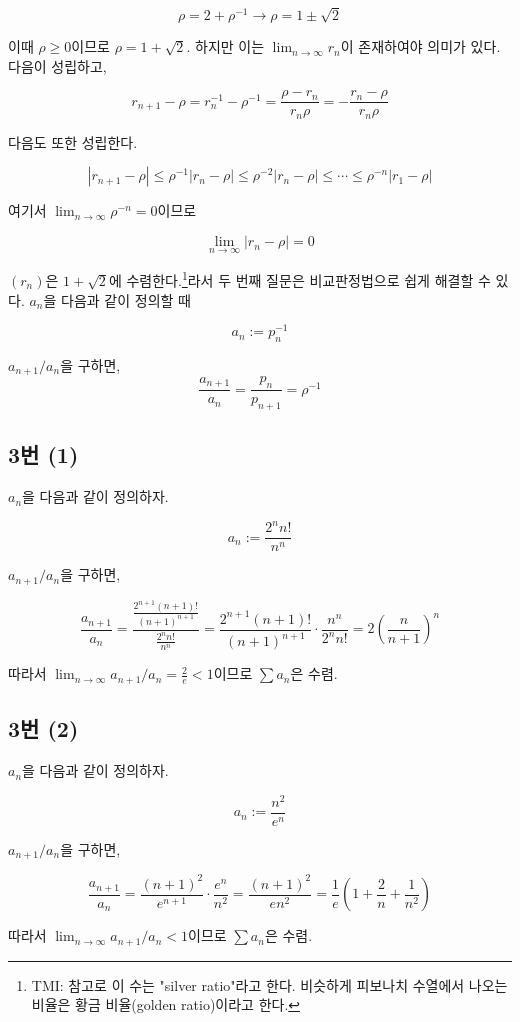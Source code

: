 \[
\rho=2+\rho^{-1} \longrightarrow \rho=1\pm\sqrt{2}
\]

이때 $\rho\geq0$이므로 $\rho=1+\sqrt{2}$. 하지만 이는 $\lim_{n\to\infty}r_n$이 존재하여야 의미가 있다. 다음이 성립하고,

\[
r_{n+1}-\rho=r_n^{-1}-\rho^{-1}=\frac{\rho-r_n}{r_n\rho}=-\frac{r_n-\rho}{r_n\rho}
\]

다음도 또한 성립한다.

\[
|r_{n+1}-\rho|\leq\rho^{-1}|r_n-\rho|\leq\rho^{-2}|r_n-\rho|\leq\cdots\leq\rho^{-n}|r_1-\rho|
\]

여기서 $\lim_{n\to\infty}\rho^{-n}=0$이므로

\[
\lim_{n\to\infty}|r_n-\rho|=0
\]

$(r_n)$은 $1+\sqrt{2}$에 수렴한다.\footnote{TMI: 참고로 이 수는 "silver ratio"라고 한다. 비슷하게 피보나치 수열에서 나오는 비율은 황금 비율(golden ratio)이라고 한다.}라서 두 번째 질문은 비교판정법으로 쉽게 해결할 수 있다. $a_n$을 다음과 같이 정의할 때

\[
a_n:=p_n^{-1}
\]

$a_{n+1}/a_n$을 구하면,
\[
\frac{a_{n+1}}{a_n}=\frac{p_n}{p_{n+1}}=\rho^{-1}
\]

\subsection{3번 (1)}
$a_n$을 다음과 같이 정의하자.

\[
a_n:=\frac{2^{n}n!}{n^n}
\]

$a_{n+1}/a_n$을 구하면,

\[
\frac{a_{n+1}}{a_n}=\frac{\frac{2^{n+1}(n+1)!}{(n+1)^{n+1}}}{\frac{2^{n}n!}{n^n}}=\frac{2^{n+1}(n+1)!}{(n+1)^{n+1}}\cdot\frac{n^n}{2^{n}n!}=2(\frac{n}{n+1})^n
\]

따라서 $\lim_{n\to\infty}a_{n+1}/a_n=\frac{2}{e}<1$이므로 $\sum a_n$은 수렴.

\subsection{3번 (2)}
$a_n$을 다음과 같이 정의하자.

\[
a_n:=\frac{n^2}{e^n}
\]

$a_{n+1}/a_n$을 구하면,

\[
\frac{a_{n+1}}{a_n}=\frac{(n+1)^2}{e^{n+1}}\cdot\frac{e^n}{n^2}=\frac{(n+1)^2}{en^2}=\frac{1}{e}(1+\frac{2}{n}+\frac{1}{n^2})
\]

따라서 $\lim_{n\to\infty}a_{n+1}/a_n<1$이므로 $\sum a_n$은 수렴.

